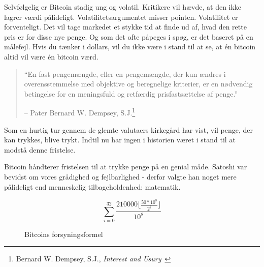 \documentclass[paper=6in:9in,pagesize=pdftex,headinclude=on,footinclude=on,12pt]{scrbook}
\begin{document}
Selvfølgelig er Bitcoin stadig ung og volatil. Kritikere vil hævde, at den ikke lagrer værdi pålideligt. Volatilitetsargumentet misser pointen. Volatilitet er forventeligt. Det vil tage markedet et stykke tid at finde ud af, hvad den rette pris er for disse nye penge. Og som det ofte påpeges i spøg, er det baseret på en målefejl. Hvis du tænker i dollars, vil du ikke være i stand til at se, at \'en bitcoin altid vil være \'en bitcoin værd.\begin{quotation}\begin{samepage} \enquote{En fast pengemængde, eller en pengemængde, der kun ændres i overensstemmelse med objektive og beregnelige kriterier, er en nødvendig betingelse for en meningsfuld og retfærdig prisfastsættelse af penge.} \begin{flushright} -- Pater Bernard W. Dempsey, S.J.\footnote{Bernard W. Dempsey, S.J., \textit{Interest and Usury}~\cite[p.~210]{dempsey_interest_1943}}
\end{flushright}\end{samepage}\end{quotation}

\newpage

Som en hurtig tur gennem de glemte valutaers kirkegård har vist, vil penge, der kan trykkes, blive trykt. Indtil nu har ingen i historien været i stand til at modstå denne fristelse.

Bitcoin håndterer fristelsen til at trykke penge på en genial måde. Satoshi var bevidst om vores grådighed og fejlbarlighed - derfor valgte han noget mere pålideligt end menneskelig tilbageholdenhed: matematik.\begin{figure}
  \centering
  \begin{equation}
  \sum\limits_{i=0}^{32} \frac{210000 \lfloor \frac{50*10^8}{2^i} \rfloor}{10^8}
  \end{equation}
  \caption{Bitcoins forsyningsformel}
  \label{fig:supply-formula-white}
\end{figure}
\end{document}
